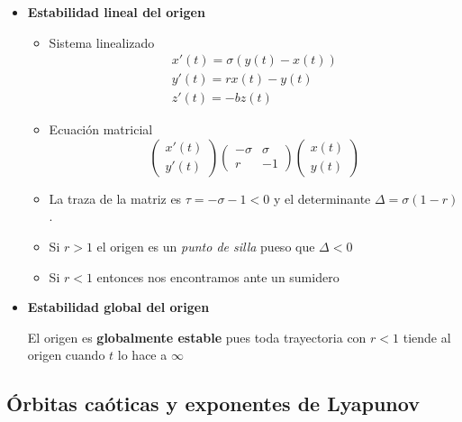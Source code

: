 \documentclass[8pt]{beamer}
\begin{document}
\begin{frame}
\begin{itemize}[<+(1)->]
\item \textbf{Estabilidad lineal del origen}

\begin{itemize}[<+(1)->]
\item Sistema linealizado
\[\begin{array}{l}
x'(t) = σ(y(t)-x(t)) \\
y'(t) = rx(t)-y(t)\\
z'(t) = -bz(t)
\end{array}\]
\item Ecuación matricial
\[\left(\begin{array}{l}
x'(t) \\ y'(t)
\end{array} \right)\left(\begin{array}{cc}
-σ & σ \\ r & -1
\end{array} \right)\left(\begin{array}{l}
x(t) \\ y(t)
\end{array} \right)\]
\item La traza de la matriz es $τ=-σ-1<0$ y el determinante $Δ = σ(1-r)$.
\item Si $r>1$ el origen es un \emph{punto de silla} pueso que $Δ<0$
\item Si $r<1$ entonces nos encontramos ante un sumidero
\end{itemize}
\item \textbf{Estabilidad global del origen}

El origen es \textbf{globalmente estable} pues toda trayectoria con $r<1$ tiende al origen cuando $t$ lo hace a $\infty$
\end{itemize}
\end{frame}


\subsection{Órbitas caóticas y exponentes de Lyapunov}
\end{document}

